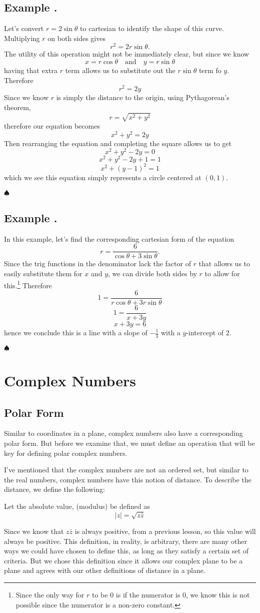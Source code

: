 \documentclass[11pt]{article}
\numberwithin{lemma}{section}
\numberwithin{equation}{section}
\numberwithin{define}{section}
\numberwithin{prop}{section}
\numberwithin{figure}{section}
\numberwithin{theorem}{section}
\numberwithin{cor}{section}
\newcounter{ex}[section]
\newenvironment{ex}[0]{

	\refstepcounter{ex}
    \subsection*{Example \theex .}
    }
    {
    \hfill$\spadesuit$
    \par
    }
\numberwithin{ex}{section}
\def\jand{\quad\text{and}\quad}
\begin{document}
\begin{ex}
	Let's convert $r=2\sin\theta$ to cartesian to identify the shape of this curve.
	Multiplying $r$ on both sides gives
	$$r^2=2r\sin\theta.$$
	The utility of this operation might not be immediately clear, but since we know
	$$x=r\cos\theta \jand y=r\sin\theta$$
	having that extra $r$ term allows us to substitute out the $r\sin\theta$ term fo $y$. Therefore
	$$r^2=2y$$
	Since we know $r$ is simply the distance to the origin, using Pythagorean's theorem,
	$$r=\sqrt{x^2+y^2}$$
	therefore our equation becomes
	$$x^2+y^2=2y$$
	Then rearranging the equation and completing the square allows us to get
	$$x^2+y^2-2y=0$$
	$$x^2+y^2-2y+1=1$$
	$$x^2+(y-1)^2=1$$
	which we see this equation simply represents a circle centered at $(0,1)$.
\end{ex}

\begin{ex}
	In this example, let's find the corresponding cartesian form of the equation
	$$r=\frac{6}{\cos\theta+3\sin\theta}.$$
	Since the trig functions in the denominator lack the factor of $r$ that allows us to easily substitute them for $x$ and $y$, we can divide both sides by $r$ to allow for this.\footnote{Since the only way for $r$ to be 0 is if the numerator is 0, we know this is not possible since the numerator is a non-zero constant.}
	Therefore
	$$1=\frac{6}{r\cos\theta+3r\sin\theta}$$
	$$1=\frac{6}{x+3y}$$
	$$x+3y=6$$
	hence we conclude this is a line with a slope of $-\frac{1}{3}$ with a $y$-intercept of $2$.
\end{ex}

\section{Complex Numbers}
\subsection{Polar Form}
Similar to coordinates in a plane, complex numbers also have a corresponding polar form. But before we examine that, we must define an operation that will be key for defining polar complex numbers.

I've mentioned that the complex numbers are not an ordered set, but similar to the real numbers, complex numbers have this notion of distance. To describe the distance, we define the following:
\begin{define}
	Let the absolute value, (modulus) be defined as
	$$|z|=\sqrt{z\bar{z}}$$
\end{define}
Since we know that $z\bar{z}$ is always positive, from a previous lesson, so this value will always be positive. 
This definition, in reality, is arbitrary, there are many other ways we could have chosen to define this, as long as they satisfy a certain set of criteria. But we chose this definition since it allows our complex plane to be a plane and agrees with our other definitions of distance in a plane.
\end{document}
